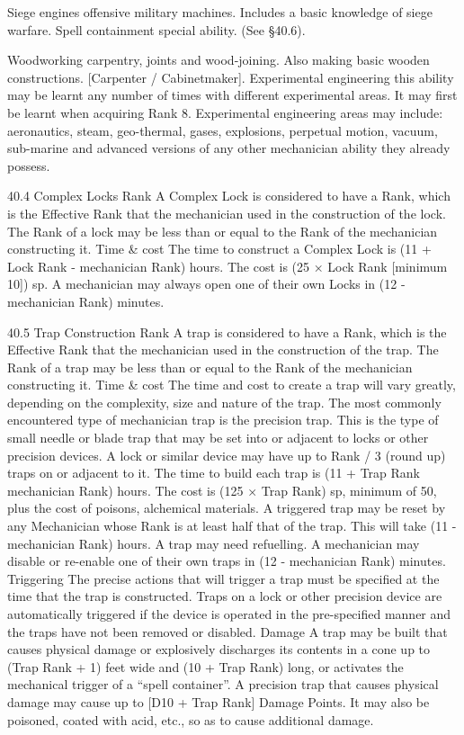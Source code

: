 \documentclass[a4paper]{article}
\begin{document}
\begin{multicols}{3}
Siege engines offensive military machines. Includes a basic knowledge of siege warfare.
Spell containment special ability. (See §40.6).

Woodworking carpentry, joints and wood-joining.
Also making basic wooden constructions. [Carpenter / Cabinetmaker].
Experimental engineering this ability may be
learnt any number of times with different experimental areas. It may first be learnt when acquiring
Rank 8. Experimental engineering areas may include: aeronautics, steam, geo-thermal, gases,
explosions, perpetual motion, vacuum, sub-marine
and advanced versions of any other mechanician
ability they already possess.

40.4 Complex Locks
Rank A Complex Lock is considered to have a
Rank, which is the Effective Rank that the
mechanician used in the construction of the lock.
The Rank of a lock may be less than or equal to the
Rank of the mechanician constructing it.
Time & cost The time to construct a Complex
Lock is (11 + Lock Rank - mechanician Rank)
hours.
The cost is (25 × Lock Rank [minimum 10]) sp.
A mechanician may always open one of their own
Locks in (12 - mechanician Rank) minutes.

40.5 Trap Construction
Rank A trap is considered to have a Rank, which
is the Effective Rank that the mechanician used in
the construction of the trap. The Rank of a trap
may be less than or equal to the Rank of the
mechanician constructing it.
Time & cost The time and cost to create a trap will
vary greatly, depending on the complexity, size
and nature of the trap.
The most commonly encountered type of mechanician trap is the precision trap. This is the type of
small needle or blade trap that may be set into or
adjacent to locks or other precision devices.
A lock or similar device may have up to Rank / 3
(round up) traps on or adjacent to it.
The time to build each trap is (11 + Trap Rank mechanician Rank) hours.
The cost is (125 × Trap Rank) sp, minimum of 50,
plus the cost of poisons, alchemical materials.
A triggered trap may be reset by any Mechanician
whose Rank is at least half that of the trap. This
will take (11 - mechanician Rank) hours. A trap
may need refuelling.
A mechanician may disable or re-enable one of
their own traps in (12 - mechanician Rank) minutes.
Triggering The precise actions that will trigger a
trap must be specified at the time that the trap is
constructed. Traps on a lock or other precision
device are automatically triggered if the device is
operated in the pre-specified manner and the traps
have not been removed or disabled.
Damage A trap may be built that causes physical
damage or explosively discharges its contents in a
cone up to (Trap Rank + 1) feet wide and (10 +
Trap Rank) long, or activates the mechanical trigger of a “spell container”.
A precision trap that causes physical damage may
cause up to [D10 + Trap Rank] Damage Points. It
may also be poisoned, coated with acid, etc., so as
to cause additional damage.


\end{multicols}
\end{document}
